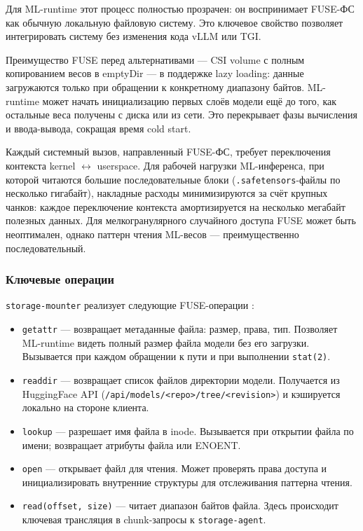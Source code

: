 Для ML-runtime этот процесс полностью прозрачен: он воспринимает FUSE-ФС как обычную локальную файловую систему. Это ключевое свойство позволяет интегрировать систему без изменения кода vLLM или TGI.

Преимущество FUSE перед альтернативами --- CSI volume с полным копированием весов в emptyDir --- в поддержке lazy loading: данные загружаются только при обращении к конкретному диапазону байтов. ML-runtime может начать инициализацию первых слоёв модели ещё до того, как остальные веса получены с диска или из сети. Это перекрывает фазы вычисления и ввода-вывода, сокращая время cold start.

 Каждый системный вызов, направленный FUSE-ФС, требует переключения контекста kernel $\leftrightarrow$ userspace. Для рабочей нагрузки ML-инференса, при которой читаются большие последовательные блоки (\texttt{.safetensors}-файлы по несколько гигабайт), накладные расходы минимизируются за счёт крупных чанков: каждое переключение контекста амортизируется на несколько мегабайт полезных данных. Для мелкогранулярного случайного доступа FUSE может быть неоптимален, однако паттерн чтения ML-весов --- преимущественно последовательный.

\subsubsection{Ключевые операции}

\texttt{storage-mounter} реализует следующие FUSE-операции \cite{gofuse}:

\begin{itemize}[leftmargin=*]
  \item \texttt{getattr} --- возвращает метаданные файла: размер, права, тип. Позволяет ML-runtime видеть полный размер файла модели без его загрузки. Вызывается при каждом обращении к пути и при выполнении \texttt{stat(2)}.
  \item \texttt{readdir} --- возвращает список файлов директории модели. Получается из HuggingFace API (\texttt{/api/models/<repo>/tree/<revision>}) и кэшируется локально на стороне клиента.
  \item \texttt{lookup} --- разрешает имя файла в inode. Вызывается при открытии файла по имени; возвращает атрибуты файла или ENOENT.
  \item \texttt{open} --- открывает файл для чтения. Может проверять права доступа и инициализировать внутренние структуры для отслеживания паттерна чтения.
  \item \texttt{read(offset, size)} --- читает диапазон байтов файла. Здесь происходит ключевая трансляция в chunk-запросы к \texttt{storage-agent}.
\end{itemize}

